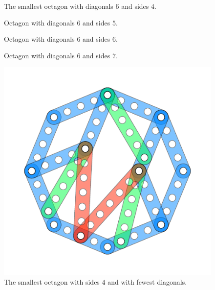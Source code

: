 \documentclass[11pt]{article}
\begin{document}
\begin{figure}
\centering
{}
\caption{The smallest octagon with diagonals $6$ and sides $4$.}
\label{fig:smallest}
\end{figure}

\begin{figure}
\centering
{}
\caption{Octagon with diagonals $6$ and sides $5$.}
\label{fig:second}
\end{figure}

\begin{figure}
\centering
{}
\caption{Octagon with diagonals $6$ and sides $6$.}
\label{fig:third}
\end{figure}

\begin{figure}
\centering
{}
\caption{Octagon with diagonals $6$ and sides $7$.}
\label{fig:fourth}
\end{figure}

\begin{figure}[htpb]
\centering
\includegraphics[]{figs/octagon-4}
\caption{The smallest octagon with sides $4$ and with fewest diagonals.}
\label{fig:smallest-simpler}
\end{figure}
\end{document}
